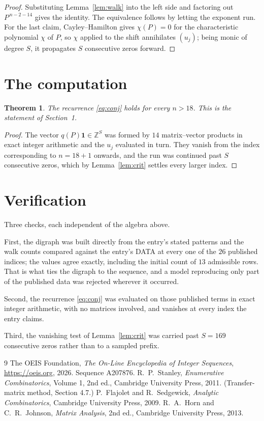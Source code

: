 \documentclass[11pt,a4paper]{article}
\theoremstyle{plain}
\newtheorem{theorem}{Theorem}
\theoremstyle{definition}
\begin{document}
\begin{proof}
Substituting Lemma~\ref{lem:walk} into the left side and factoring out
$P^{\,n-2-14}$ gives the identity. The equivalence follows by letting the exponent
run. For the last claim, Cayley--Hamilton gives $\chi(P)=0$ for the characteristic
polynomial $\chi$ of $P$, so $\chi$ applied to the shift annihilates $(u_j)$; being monic of
degree $S$, it propagates $S$ consecutive zeros forward.
\end{proof}

\section{The computation}

\begin{theorem}
The recurrence \eqref{eq:conj} holds for every $n>18$. This is the statement of
Section~1.
\end{theorem}

\begin{proof}
The vector $q(P)\mathbf{1}\in\mathbb{Z}^{S}$ was formed by $14$ matrix--vector
products in exact integer arithmetic and the $u_j$ evaluated in turn. They vanish from the
index corresponding to $n=18+1$ onwards, and the run was continued past $S$ consecutive
zeros, which by Lemma~\ref{lem:crit} settles every larger index.
\end{proof}

\section{Verification}

Three checks, each independent of the algebra above.

First, the digraph was built directly from the entry's stated patterns and the walk counts
compared against the entry's DATA at every one of the $26$ published indices; the
values agree exactly, including the initial count of $13$ admissible rows. That is
what ties the digraph to the sequence, and a model reproducing only part of the published
data was rejected wherever it occurred.

Second, the recurrence \eqref{eq:conj} was evaluated on those published terms in exact
integer arithmetic, with no matrices involved, and vanishes at every index the entry claims.

Third, the vanishing test of Lemma~\ref{lem:crit} was carried past $S=169$ consecutive
zeros rather than to a sampled prefix.

\begin{thebibliography}{9}
 The OEIS Foundation, \emph{The On-Line Encyclopedia of Integer
Sequences}, \url{https://oeis.org}, 2026. Sequence A207876.
 R.~P.~Stanley, \emph{Enumerative Combinatorics}, Volume 1, 2nd ed.,
Cambridge University Press, 2011. (Transfer-matrix method, Section 4.7.)
 P.~Flajolet and R.~Sedgewick, \emph{Analytic Combinatorics}, Cambridge
University Press, 2009.
 R.~A.~Horn and C.~R.~Johnson, \emph{Matrix Analysis}, 2nd ed., Cambridge
University Press, 2013.
\end{thebibliography}
\end{document}
